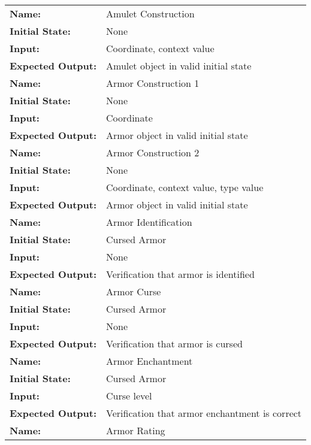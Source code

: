 \documentclass[12pt, titlepage]{article}
\begin{document}
		\begin{center}

			\begin{longtable}{ l | p{10cm} }
				\hline
				\rule{0pt}{1.5em}\textbf{Name:} & Amulet Construction\\
				\textbf{Initial State:} & None\\
				\textbf{Input:} & Coordinate, context value\\
				\textbf{Expected Output:} & Amulet object in valid initial state\\[0.6em]
				\hline
				\rule{0pt}{1.5em}\textbf{Name:} & Armor Construction 1\\
				\textbf{Initial State:} & None\\
				\textbf{Input:} & Coordinate\\
				\textbf{Expected Output:} & Armor object in valid initial state\\[0.6em]
				\hline
				\rule{0pt}{1.5em}\textbf{Name:} & Armor Construction 2\\
				\textbf{Initial State:} & None\\
				\textbf{Input:} & Coordinate, context value, type value\\
				\textbf{Expected Output:} & Armor object in valid initial state\\[0.6em]
				\hline
				\rule{0pt}{1.5em}\textbf{Name:} & Armor Identification\\
				\textbf{Initial State:} & Cursed Armor\\
				\textbf{Input:} & None\\
				\textbf{Expected Output:} & Verification that armor is identified\\[0.6em]
				\hline
				\rule{0pt}{1.5em}\textbf{Name:} & Armor Curse\\
				\textbf{Initial State:} & Cursed Armor\\
				\textbf{Input:} & None\\
				\textbf{Expected Output:} & Verification that armor is cursed\\[0.6em]
				\hline
				\rule{0pt}{1.5em}\textbf{Name:} & Armor Enchantment\\
				\textbf{Initial State:} & Cursed Armor\\
				\textbf{Input:} & Curse level\\
				\textbf{Expected Output:} & Verification that armor enchantment is correct\\[0.6em]
				\hline
				\rule{0pt}{1.5em}\textbf{Name:} & Armor Rating\\

\end{longtable}
\end{center}
\end{document}
